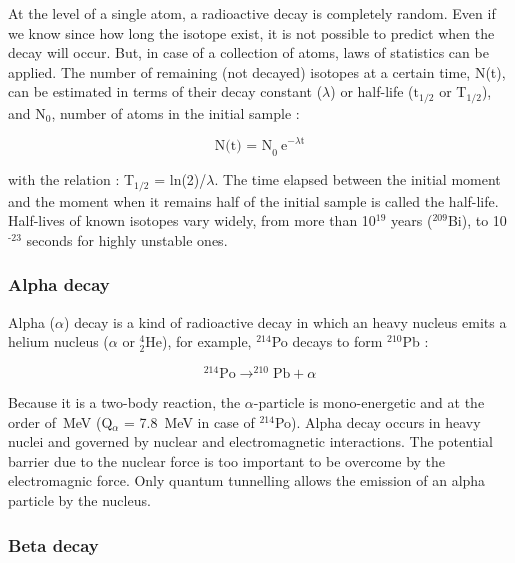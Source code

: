 \documentclass[main.tex]{subfiles}
\begin{document}
\bigskip


\NI At the level of a single atom, a radioactive decay is completely random. Even if we know since how long the isotope exist, it is not possible to predict when the decay will occur. But, in case of a collection of atoms, laws of statistics can be applied. The number of remaining (not decayed) isotopes at a certain time, N(t), can be estimated in terms of their decay constant ($\lambda$) or half-life ($\text{t}_{\text{1/2}}$ or T$_{\text{1/2}}$), and N$_\text{0}$, number of atoms in the initial sample : 


\begin{equation}
\text{N(t) = N}_\text{0}~\text{e} ^{-\lambda\text{t}}
\end{equation}


\NI with the relation : T$_{\text{1/2}}$ = ln(2)/$\lambda$. The time elapsed between the initial moment and the moment when it remains half of the initial sample is called the half-life. Half-lives of known isotopes vary widely, from more than 10$^{\text{19}}$ years ($^{\text{209}}$Bi), to 10$^{\text{-23}}$ seconds for highly unstable ones.


\subsubsection{Alpha decay}


\NI Alpha ($\alpha$) decay is a kind of radioactive decay in which an heavy nucleus emits a helium nucleus ($\alpha$ or $^{\text{4}}_{\text{2}}$He), for example, $^{\text{214}}$Po decays to form $^{\text{210}}$Pb :


\begin{equation}
 ^{\text{214}}\text{Po} \rightarrow  ^{\text{210}}\text{Pb} + \alpha
\end{equation} 


\NI Because it is a two-body reaction, the $\alpha$-particle is mono-energetic and at the order of~MeV (Q$_{\alpha}$ = 7.8~MeV in case of $^{\text{214}}$Po). Alpha decay occurs in heavy nuclei and governed by nuclear and electromagnetic interactions. The potential barrier due to the nuclear force is too important to be overcome by the electromagnic force. Only quantum tunnelling allows the emission of an alpha particle by the nucleus.


\subsubsection{Beta decay}
\end{document}

